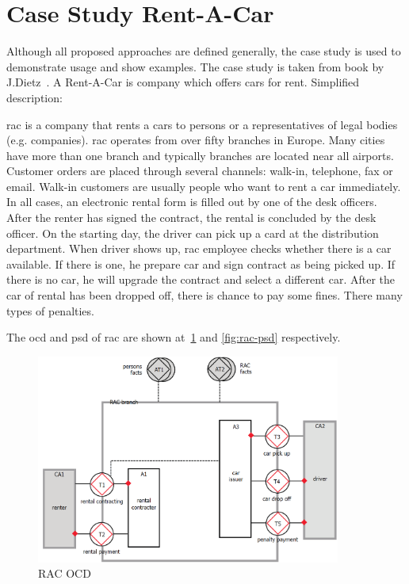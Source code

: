 
\section{Case Study Rent-A-Car}
Although all proposed approaches are defined generally, the case study is used to demonstrate usage and show examples. The case study is taken from book by J.Dietz~\cite{dietz-essence-2015}. A Rent-A-Car is company which offers cars for rent. Simplified description:

\gls{rac} is a company that rents a cars to persons or a representatives of legal bodies (e.g. companies). \gls{rac} operates from over fifty branches in Europe. Many cities have more than one branch and typically branches are located near all airports. 
Customer orders are placed through several channels: walk-in, telephone, fax or email. Walk-in customers are usually people who want to rent a car immediately. In all cases, an electronic rental form is filled out by one of the desk officers. 
After the renter has signed the contract, the rental is concluded by the desk officer. On the starting day, the driver can pick up a card at the distribution department. When driver shows up, \gls{rac} employee checks whether there is a car available. If there is one, he prepare car and sign contract as being picked up. If there is no car, he will upgrade the contract and select a different car. 
After the car of rental has been dropped off, there is chance to pay some fines. There many types of penalties.

The \gls{ocd} and \gls{psd} of \gls{rac} are shown at~\cref{fig:rac-ocd} and \cref{fig:rac-psd} respectively.
\begin{figure}[ht!]
\centering
\includegraphics[width=10cm,keepaspectratio]{img/rac-ocd}
\caption{RAC OCD}
\label{fig:rac-ocd}
\end{figure}

